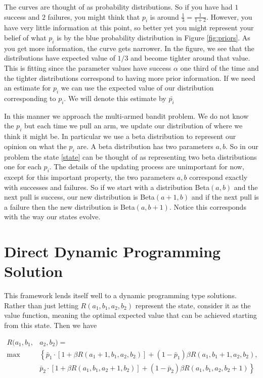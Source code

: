 The curves are thought of as probability distributions.  So if you have had $1$ success and $2$ failures, you might think that $p_i$ is around $\frac{1}{3} = \frac{1}{1+2}$. However, you have very little information at this point, so better yet you might represent your belief of what $p_i$ is by the blue probability distribution in Figure \ref{fig:priors}.  As you get more information, the curve gets narrower.  In the figure, we see that the distributions have expected value of $1/3$ and become tighter around that value.  This is fitting since the parameter values have success $\alpha$ one third of the time and the tighter distributions correspond to having more prior information.  If we need an estimate for $p_i$ we can use the expected value of our distribution corresponding to $p_i$.  We will denote this estimate by $\bar{p_i}$

In this manner we approach the multi-armed bandit problem.  We do not know the $p_i$ but each time we pull an arm, we update our distribution of where we think it might be.  In particular we use a beta distribution to represent our opinion on what the $p_i$ are.  A beta distribution has two parameters $a,b$.  So in our problem the state \eqref{state} can be thought of as representing two beta distributions one for each $p_i$. The details of the updating process are unimportant for now, except for this important property, the two parameters $a,b$ correspond exactly with successes and failures.  So if we start with a distribution Beta$(a,b)$ and the next pull is success, our new distribution is Beta$(a+1,b)$ and if the next pull is a failure then the new distribution is Beta$(a,b+1)$.  Notice this corresponds with the way our states evolve.


\section*{Direct Dynamic Programming Solution}
This framework lends itself well to a dynamic programming type solutions.  Rather than just letting $R(a_1,b_1,a_2,b_2)$ represent the state, consider it as the value function, meaning the optimal expected value that can be achieved starting from this state.  Then we have

\begin{equation}\label{recurs}
\begin{aligned}
R(a_1,b_1,&a_2,b_2) =\\
 \max&\left\{\bar{p}_1\cdot[1 + \beta R(a_1+1,b_1,a_2,b_2)] + (1-\bar{p}_1)\beta R(a_1,b_1+1,a_2,b_2)\right. ,\\
&  \left.\bar{p}_2\cdot[1 + \beta R(a_1,b_1,a_2+1,b_2)] + (1-\bar{p}_2)\beta R(a_1,b_1,a_2,b_2+1)\right\}
\end{aligned}
\end{equation}

